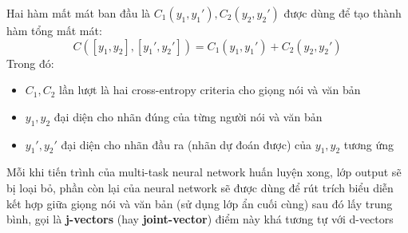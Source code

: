 \documentclass{article}
\begin{document}
	Hai hàm mất mát ban đầu là $C_1(y_1, y_1'), C_2(y_2, y_2')$ được dùng để tạo thành hàm tổng mất mát:
	$$C([y_1, y_2], [y_1', y_2']) = C_1(y_1, y_1') + C_2(y_2, y_2')$$
	Trong đó:
	\begin{itemize}
		\item $C_1, C_2$ lần lượt là hai cross-entropy criteria cho giọng nói và văn bản
		\item $y_1, y_2$ đại diện cho nhãn đúng của từng người nói và văn bản
		\item $y_1', y_2'$ đại diện cho nhãn đầu ra (nhãn dự đoán được) của $y_1, y_2$ tương ứng
	\end{itemize}
	
	Mỗi khi tiến trình của multi-task neural network huấn luyện xong, lớp output sẽ bị loại bỏ, phần còn lại của neural network sẽ được dùng để rút trích biểu diễn kết hợp giữa giọng nói và văn bản (sử dụng lớp ẩn cuối cùng) sau đó lấy trung bình, gọi là \textbf{j-vectors} (hay \textbf{joint-vector}) điểm này khá tương tự với d-vectors
	
\end{document}
